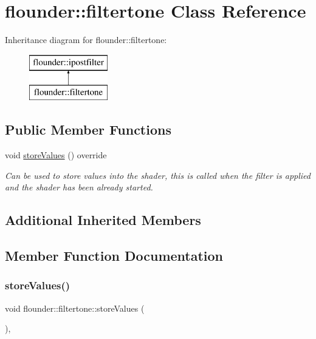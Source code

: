 \hypertarget{classflounder_1_1filtertone}{}\section{flounder\+:\+:filtertone Class Reference}
\label{classflounder_1_1filtertone}
Inheritance diagram for flounder\+:\+:filtertone\+:\begin{figure}[H]
\begin{center}
\leavevmode
\includegraphics[height=2.000000cm]{classflounder_1_1filtertone}
\end{center}
\end{figure}
\subsection*{Public Member Functions}
\begin{DoxyCompactItemize}
\item 
void \hyperlink{classflounder_1_1filtertone_ad2b3b402d4f9fd38f918b410652ee96b}{store\+Values} () override
\begin{DoxyCompactList}\small\item\em Can be used to store values into the shader, this is called when the filter is applied and the shader has been already started. \end{DoxyCompactList}\end{DoxyCompactItemize}
\subsection*{Additional Inherited Members}


\subsection{Member Function Documentation}
\mbox{\label{classflounder_1_1filtertone_ad2b3b402d4f9fd38f918b410652ee96b}} 
\subsubsection{\texorpdfstring{store\+Values()}{storeValues()}}
{\footnotesize\ttfamily void flounder\+::filtertone\+::store\+Values (\begin{DoxyParamCaption}{ }\end{DoxyParamCaption})\hspace{0.3cm}{\ttfamily [override]}, {\ttfamily [virtual]}}



